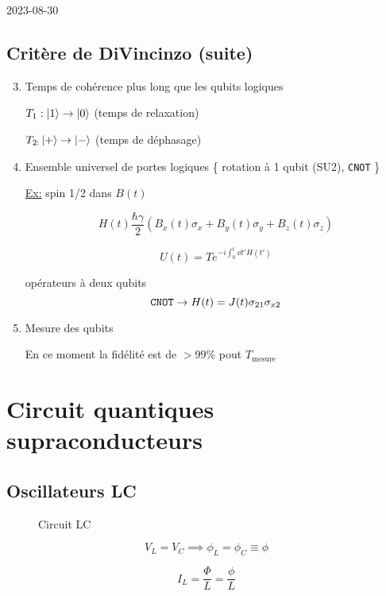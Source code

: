 


2023-08-30

\setcounter{section}{1}
\setcounter{subsection}{2}

\subsection{Critère de DiVincinzo (suite)}

\begin{enumerate}
	\setcounter{enumi}{2}
	
	\item Temps de cohérence plus long que les qubits logiques
	
		$T_1 : \ket{1} \to \ket{0}$ (temps de relaxation)

		$T_{2:} \ket{+} \to \ket{-}$ (temps de déphasage)

	\item Ensemble universel de portes logiques
		\{ rotation à 1 qubit (SU2), \verb|CNOT| \}

		\underline{Ex:} spin 1/2 dans $B(t)$

		\[ H(t) \frac{\hbar\gamma}{2} \left( B_x (t) \sigma_x + B_y (t) \sigma_y + B_z (t) \sigma_z \right)  \]

		\[ U(t) = T e^{-i \int_{0}^{t}\dd t' H(t')} \]

		opérateurs à deux qubits
		\[ 	\verb|CNOT| \to H(t) = J(t) \sigma_{21}\sigma_{x2}   \]
	\item Mesure des qubits 

		En ce moment la fidélité est de $>99\%$ pout $T_{\text{mesure}} $

\end{enumerate}


\section{Circuit quantiques supraconducteurs}

\subsection{Oscillateurs LC}

\begin{figure}[ht]
		\centering
		\caption{Circuit LC}
		\label{fig:lc}
\end{figure}


\[ V_L = V_C \implies \phi_L = \phi_C \equiv \phi \]

\[ I_L = \frac{\Phi}{L} = \frac{\phi}{L}  \]

